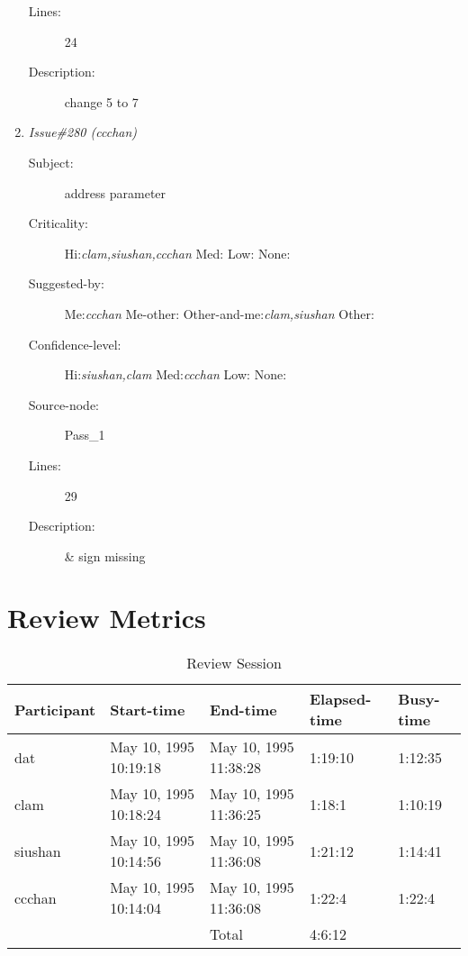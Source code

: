\begin{enumerate}
\begin{description}
\item [Lines:] 24

\item [Description:] change  5 to 7
\end{description}
\item {\it Issue\#280 (ccchan)}
\begin{description}
\item [Subject:] address parameter
\item [Criticality:] Hi:{\it clam,siushan,ccchan} Med:{\it } Low:{\it } None:{\it }
\item [Suggested-by:] Me:{\it ccchan} Me-other:{\it } Other-and-me:{\it clam,siushan} Other:{\it }
\item [Confidence-level:] Hi:{\it siushan,clam} Med:{\it ccchan} Low:{\it } None:{\it }
\item [Source-node:] Pass\_1

\item [Lines:] 29

\item [Description:] \& sign missing
\end{description}
\end{enumerate}
\section{Review Metrics}
\begin{table}[hb]
\begin{center}
\begin{tabular}{|l|l|l|l|l|}
\hline
Participant & Start-time & End-time & Elapsed-time & Busy-time \\
\hline
dat & May 10, 1995 10:19:18 & May 10, 1995 11:38:28 & 1:19:10 & 1:12:35 \\
clam & May 10, 1995 10:18:24 & May 10, 1995 11:36:25 & 1:18:1 & 1:10:19 \\
siushan & May 10, 1995 10:14:56 & May 10, 1995 11:36:08 & 1:21:12 & 1:14:41 \\
ccchan & May 10, 1995 10:14:04 & May 10, 1995 11:36:08 & 1:22:4 & 1:22:4 \\
\hline
 & & Total & 4:6:12 & \\
\hline
\end{tabular}
\end{center}
\caption{Review Session}
\end{table}


